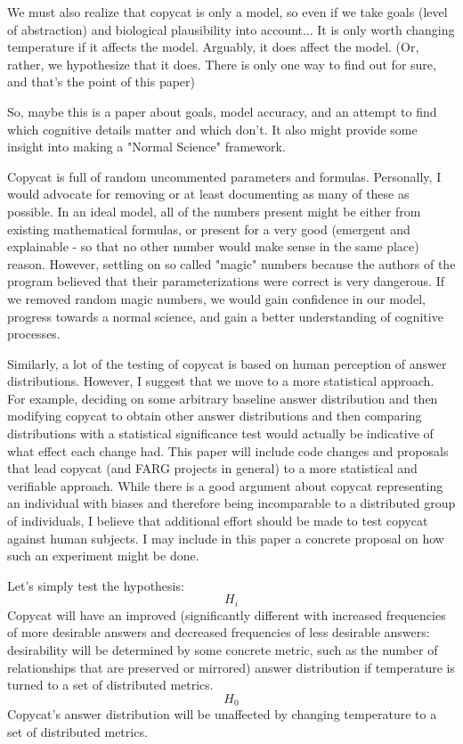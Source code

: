 We must also realize that copycat is only a model, so even if we take goals (level of abstraction) and biological plausibility into account...
It is only worth changing temperature if it affects the model.
Arguably, it does affect the model. (Or, rather, we hypothesize that it does. There is only one way to find out for sure, and that's the point of this paper)

So, maybe this is a paper about goals, model accuracy, and an attempt to find which cognitive details matter and which don't. It also might provide some insight into making a "Normal Science" framework.

Copycat is full of random uncommented parameters and formulas. Personally, I would advocate for removing or at least documenting as many of these as possible. In an ideal model, all of the numbers present might be either from existing mathematical formulas, or present for a very good (emergent and explainable - so that no other number would make sense in the same place) reason. However, settling on so called "magic" numbers because the authors of the program believed that their parameterizations were correct is very dangerous. If we removed random magic numbers, we would gain confidence in our model, progress towards a normal science, and gain a better understanding of cognitive processes. 

Similarly, a lot of the testing of copycat is based on human perception of answer distributions. However, I suggest that we move to a more statistical approach. For example, deciding on some arbitrary baseline answer distribution and then modifying copycat to obtain other answer distributions and then comparing distributions with a statistical significance test would actually be indicative of what effect each change had. This paper will include code changes and proposals that lead copycat (and FARG projects in general) to a more statistical and verifiable approach.
While there is a good argument about copycat representing an individual with biases and therefore being incomparable to a distributed group of individuals, I believe that additional effort should be made to test copycat against human subjects.  I may include in this paper a concrete proposal on how such an experiment might be done.

Let's simply test the hypothesis: \[H_i\] Copycat will have an improved (significantly different with increased frequencies of more desirable answers and decreased frequencies of less desirable answers: desirability will be determined by some concrete metric, such as the number of relationships that are preserved or mirrored) answer distribution if temperature is turned to a set of distributed metrics. \[H_0\] Copycat's answer distribution will be unaffected by changing temperature to a set of distributed metrics.

